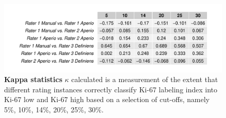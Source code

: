 \documentclass[final,5p,times,twocolumn]{elsarticle}
\begin{document}
\begin{figure}
\includegraphics[width = \linewidth]{kappaStat}
\centering
\caption{{\bf Kappa statistics }
$\kappa$ calculated is a measurement of the extent that different rating instances correctly classify Ki-67 labeling index into Ki-67 low and Ki-67 high based on a selection of cut-offs, namely 5\%, 10\%, 14\%, 20\%, 25\%, 30\%.
}
\label{kappaStat}
\end{figure}
\end{document}
